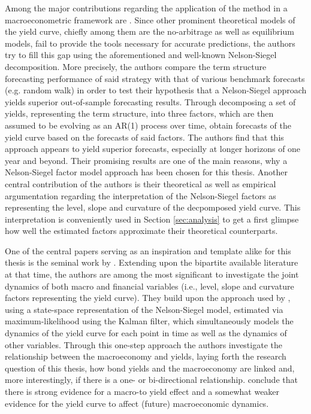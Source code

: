 Among the major contributions regarding the application of the \citet{nelson1987parsimonious} method in a macroeconometric framework are \citet{diebold2006forecasting}. Since other prominent theoretical models of the yield curve, chiefly among them are the no-arbitrage as well as equilibrium models, fail to provide the tools necessary for accurate predictions, the authors try to fill this gap using the aforementioned and well-known Nelson-Siegel decomposition.
More precisely, the authors compare the term structure forecasting performance of said  strategy with that of various benchmark forecasts (e.g. random walk) in order to test their hypothesis that a Nelson-Siegel approach yields superior out-of-sample forecasting results.
Through decomposing a set of yields, representing the term structure, into three factors, which are then assumed to be evolving as an AR(1) process over time, \citet{diebold2006forecasting} obtain forecasts of the yield curve based on the forecasts of said factors.
The authors find that this approach appears to yield superior forecasts, especially at longer horizons of one year and beyond.
Their promising results are one of the main reasons, why a Nelson-Siegel factor model approach has been chosen for this thesis.
Another central contribution of the authors is their theoretical as well as empirical argumentation regarding the interpretation of the Nelson-Siegel factors as representing the level, slope and curvature of the decpomposed yield curve. This interpretation is conveniently used in Section \ref{sec:analysis} to get a first glimpse how well the estimated factors approximate their theoretical counterparts. 

One of the central papers serving as an inspiration and template alike for this thesis is the seminal work by \citet{diebold2006macroeconomy}. 
Extending upon the bipartite available literature at that time, the authors are among the most significant to investigate the joint dynamics of both macro and financial variables (i.e., level, slope and curvature factors representing the yield curve). 
They build upon the approach used by \citet{diebold2006forecasting}, using a state-space representation of the Nelson-Siegel model, estimated via maximum-likelihood using the Kalman filter, which simultaneously models the dynamics of the yield curve for each point in time as well as the dynamics of other variables. Through this one-step approach the authors investigate the relationship between the macroeconomy and yields, laying forth the research question of this thesis, how bond yields and the macroeconomy are linked and, more interestingly, if there is a one- or bi-directional relationship. 
\citet{diebold2006macroeconomy} conclude that there is strong evidence for a macro-to yield effect and a somewhat weaker evidence for the yield curve to affect (future) macroeconomic dynamics. 


